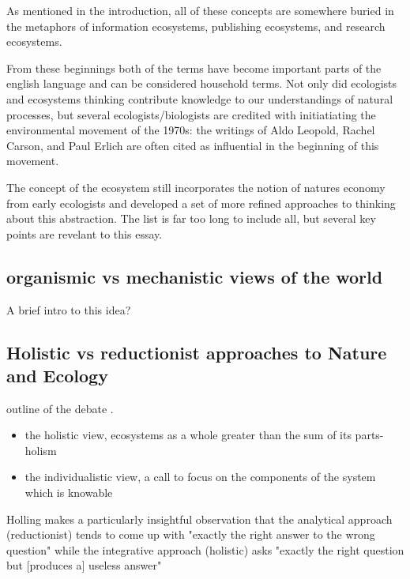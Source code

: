 As mentioned in the introduction, all of these concepts are somewhere buried in the metaphors of information ecosystems, publishing ecosystems, and research ecosystems.

From these beginnings both of the terms have become important parts of the english language and can be considered household terms. Not only did ecologists and ecosystems thinking contribute knowledge to our understandings of natural processes, but several ecologists/biologists are credited with initiatiating the environmental movement of the 1970s: the writings of Aldo Leopold, Rachel Carson, and Paul Erlich are often cited as influential in the beginning of this movement.

The concept of the ecosystem still incorporates the notion of natures economy from early ecologists and developed a set of more refined approaches to thinking about this abstraction. The list is far too long to include all, but several key points are revelant to this essay. 



\subsection{organismic vs mechanistic views of the world}

A brief intro to this idea?

\subsection{Holistic vs reductionist approaches to Nature and Ecology}

outline of the debate \cite{holling_1998, worster_1977}. \begin{itemize} \item the holistic view, ecosystems as a whole greater than the sum of its parts-holism \cite{clements_1936} \item the individualistic view, a call to focus on the components of the system which is knowable \cite{gleason_1939} \end{itemize}

Holling makes a particularly insightful observation that the analytical approach (reductionist) tends to come up with "exactly the right answer to the wrong question" while the integrative approach (holistic) asks "exactly the right question but [produces a] useless answer" \cite[][p. 3]{holling_1998} 

